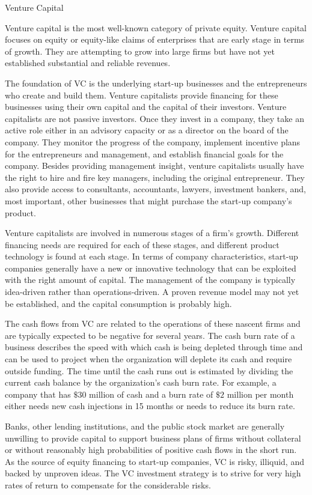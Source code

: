 \documentclass[11pt]{article}
\begin{document}
Venture Capital

Venture capital is the most well-known category of private equity. Venture capital focuses on equity or equity-like claims of enterprises that are early stage in terms of growth. They are attempting to grow into large firms but have not yet established substantial and reliable revenues.

The foundation of VC is the underlying start-up businesses and the entrepreneurs who create and build them. Venture capitalists provide financing for these businesses using their own capital and the capital of their investors. Venture capitalists are not passive investors. Once they invest in a company, they take an active role either in an advisory capacity or as a director on the board of the company. They monitor the progress of the company, implement incentive plans for the entrepreneurs and management, and establish financial goals for the company. Besides providing management insight, venture capitalists usually have the right to hire and fire key managers, including the original entrepreneur. They also provide access to consultants, accountants, lawyers, investment bankers, and, most important, other businesses that might purchase the start-up company's product.

Venture capitalists are involved in numerous stages of a firm's growth. Different financing needs are required for each of these stages, and different product technology is found at each stage. In terms of company characteristics, start-up companies generally have a new or innovative technology that can be exploited with the right amount of capital. The management of the company is typically idea-driven rather than operations-driven. A proven revenue model may not yet be established, and the capital consumption is probably high.

The cash flows from VC are related to the operations of these nascent firms and are typically expected to be negative for several years. The cash burn rate of a business describes the speed with which cash is being depleted through time and can be used to project when the organization will deplete its cash and require outside funding. The time until the cash runs out is estimated by dividing the current cash balance by the organization's cash burn rate. For example, a company that has $\$ 30$ million of cash and a burn rate of $\$ 2$ million per month either needs new cash injections in 15 months or needs to reduce its burn rate.

Banks, other lending institutions, and the public stock market are generally unwilling to provide capital to support business plans of firms without collateral or without reasonably high probabilities of positive cash flows in the short run. As the source of equity financing to start-up companies, VC is risky, illiquid, and backed by unproven ideas. The VC investment strategy is to strive for very high rates of return to compensate for the considerable risks.
\end{document}

